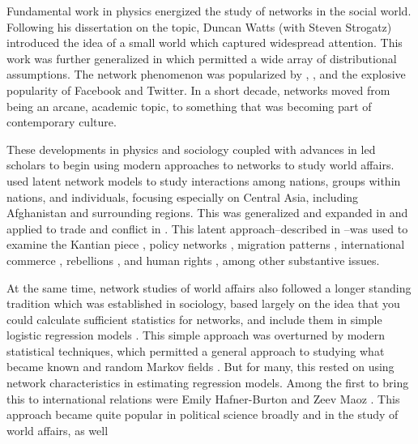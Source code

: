 \documentclass[12pt,oneside,doublespace,pdflatex]{amsart}
\begin{document}
Fundamental work in physics energized the study of networks in the social world.  Following his dissertation on the topic,
Duncan Watts (with Steven Strogatz) introduced the idea of a small world \citep{watts:strogatz:1998} which captured widespread attention. This work was further generalized in \citet{newman:etal:2001} which permitted
a wide array of distributional assumptions.  The network phenomenon was popularized by 
\citet{watts:2004}, \cite{christakis:fowler:2009}, and the explosive popularity of Facebook and Twitter.  In a short decade,
networks moved from being an arcane, academic topic, to something that was becoming part of contemporary culture.

These developments in physics and sociology coupled with advances in led scholars to begin using
modern approaches to networks to study world affairs.  \citet{ward:hoff:etal:2003} used latent network
models to study interactions among nations, groups within nations, and individuals, focusing especially on Central Asia, including Afghanistan and surrounding regions. This was generalized and expanded in \citet{hoff:ward:2004} and applied to trade and conflict in \citep{ward:hoff:2007}. This latent approach--described in \citet{dorff:ward:2013}--was used to examine the Kantian piece \citep{ward:siverson:cao:2007}, policy networks \citep{cao:2009,cao:2010}, migration patterns \citep{breunig:cao:etal:2011}, international commerce \cite{ward:ahlquist:etal:2012}, rebellions \citep{metternich:dorff:etal:2013}, and human rights \citep{greenhill:2015}, among other substantive issues.

At the same time, network studies of world affairs also followed a longer standing tradition which was established in sociology, based largely on the idea that you could calculate sufficient statistics for networks, and include them in simple logistic regression models \citep{frank:1971,besag:1977b}.  This simple approach was overturned by modern statistical techniques, which permitted a general approach to studying what became known and random Markov fields \citep{besag:1985,besag:clifford:1989}. But for many, this rested on using network characteristics in estimating regression models. Among the first to bring this to international relations were Emily Hafner-Burton \citeyear{hafner-burton:2006,hafner-burton:kahler:etal:2009} and Zeev Maoz \citep{maoz:2006a,maoz:terris:etal:2007,maoz;2010}.  This approach became quite popular in political science broadly and in the study of world affairs, as well 
\citep[for example]{warren:2010,murdie:2014}

\citep{
lagazio:russett:2004,
cranmer:desmarais:2011,
ward:stovel:etal:2011,
cranmer:desmarais:etal:2012,
desmarais:cranmer:2012,
kinne:2012,
maoz2012special,
kinne:2013,
kinne:2014,
cranmer:desmarais:2015c,
cranmer:desmarais:2015c,
manger:pickup:2016,
chyzh:2017} 






\newpage
\end{document}
